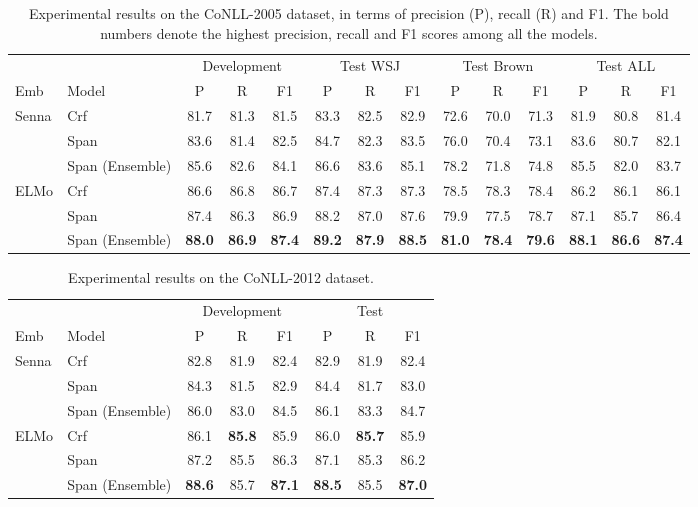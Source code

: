 \documentclass[11pt,a4paper]{article}
\begin{document}
\begin{table*}[t]
  \centering
  {\small
  \begin{tabular}{llcccccccccccc} \toprule
                  & & \multicolumn{3}{c}{Development}
                  & \multicolumn{3}{c}{Test WSJ}
                  & \multicolumn{3}{c}{Test Brown}
                  & \multicolumn{3}{c}{Test ALL} \\
                  {\sc Emb} & {\sc Model} & P & R & F1 & P & R & F1 & P & R & F1 & P & R & F1 \\ \hline
\multirow{3}{*}{\sc Senna}  & {\sc Crf}     & 81.7	& 81.3	& 81.5 & 83.3	& 82.5 &	82.9 & 72.6 &	70.0 &	71.3 & 81.9	& 80.8	& 81.4 \\
& {\sc Span}       & 83.6	& 81.4	& 82.5 & 84.7	& 82.3 &	83.5 & 76.0 	& 70.4 &	73.1& 83.6	& 80.7	& 82.1 \\
& {\sc Span} (Ensemble)      & 85.6	& 82.6	& 84.1 & 86.6	& 83.6 &	85.1 & 78.2 	& 71.8 &	74.8& 85.5	& 82.0	& 83.7 \\ \hline
\multirow{3}{*}{\sc ELMo}  & {\sc Crf} & 86.6	& 86.8	& 86.7 & 87.4	& 87.3	& 87.3 & 78.5	& 78.3	& 78.4 & 86.2	& 86.1	& 86.1\\
& {\sc Span}       & 87.4	& 86.3	& 86.9 & 88.2	& 87.0	& 87.6 & 79.9 &	77.5 &	78.7 & 87.1	& 85.7	& 86.4 \\
& {\sc Span} (Ensemble)       & {\bf 88.0}	& {\bf 86.9}	& {\bf 87.4} & {\bf 89.2}	& {\bf 87.9}	& {\bf 88.5} & {\bf 81.0} &	{\bf 78.4} &	{\bf 79.6} & {\bf 88.1}	& {\bf 86.6}	& {\bf 87.4} \\ \toprule
  \end{tabular}
  }
  \caption{\label{tab:result:conll05} Experimental results on the CoNLL-2005 dataset, in terms of precision (P), recall (R) and F1. The bold numbers denote the highest precision, recall and F1 scores among all the models.}
\end{table*}

\begin{table*}[t]
  \centering
  {\small
  \begin{tabular}{llcccccc} \toprule
                  & & \multicolumn{3}{c}{Development}
                  & \multicolumn{3}{c}{Test} \\
                  {\sc Emb} & {\sc Model} & P & R & F1 & P & R & F1 \\ \hline
                  \multirow{3}{*}{\sc Senna}  & {\sc Crf}     & 82.8 & 81.9 & 82.4 & 82.9 & 81.9 & 82.4 \\
& {\sc Span}       & 84.3 & 81.5 & 82.9 & 84.4 & 81.7 & 83.0 \\
& {\sc Span} (Ensemble)      & 86.0 & 83.0 & 84.5 & 86.1 & 83.3 & 84.7 \\ \hline
\multirow{3}{*}{\sc ELMo}  & {\sc Crf} & 86.1 &	{\bf 85.8} &	85.9 & 86.0	 & {\bf 85.7}	& 85.9\\
& {\sc Span}      & 87.2 &	85.5 &	86.3 & 87.1	& 85.3	& 86.2 \\
& {\sc Span} (Ensemble)       & {\bf 88.6} &	85.7 &	{\bf 87.1} & {\bf 88.5}	& 85.5	& {\bf 87.0} \\ \toprule
  \end{tabular}
  }
  \caption{\label{tab:result:conll12} Experimental results on the CoNLL-2012 dataset.}
\end{table*}
\end{document}
